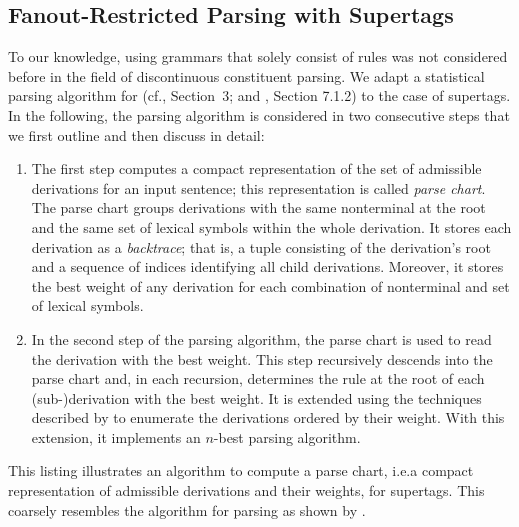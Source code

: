 \documentclass[../../document.tex]{subfiles}
\begin{document}
    \subsection{Fanout-Restricted Parsing with  Supertags}\label{sec:parsing:dcp}
    To our knowledge, using grammars that solely consist of  rules was not considered before in the field of discontinuous constituent parsing.
    We adapt a statistical parsing algorithm for  (cf.\@ \citealp{Burden05}, Section~3; and \citealp{Kal10}, Section 7.1.2) to the case of  supertags.
    In the following, the parsing algorithm is considered in two consecutive steps that we first outline and then discuss in detail:
    \begin{enumerate}
        \item \label{step:parsing:chart}
            The first step computes a compact representation of the set of admissible derivations for an input sentence; this representation is called \emph{parse chart}.
            The parse chart groups derivations with the same  nonterminal at the root and the same set of lexical symbols within the whole derivation.
            It stores each derivation as a \emph{backtrace}; that is, a tuple consisting of the derivation's root and a sequence of indices identifying all child derivations.
            Moreover, it stores the best weight of any derivation for each combination of  nonterminal and set of lexical symbols.
        \item \label{step:parsing:derivation}
            In the second step of the parsing algorithm, the parse chart is used to read the derivation with the best weight.
            This step recursively descends into the parse chart and, in each recursion, determines the rule at the root of each (sub-)derivation with the best weight.
            It is extended using the techniques described by \citet{HuaChia05} to enumerate the derivations ordered by their weight.
            With this extension, it implements an \(n\)-best parsing algorithm.
    \end{enumerate}

    \begin{algorithm}
        \caption{\label{alg:parsing:chart}
            This listing illustrates an algorithm to compute a parse chart, i.e.\@ a compact representation of admissible derivations and their weights, for  supertags.
            This coarsely resembles the algorithm for parsing  as shown by \citet[the ``na\"ive algorithm'' in Section~3]{Burden05}.
        }
        
    \end{algorithm}
\end{document}
